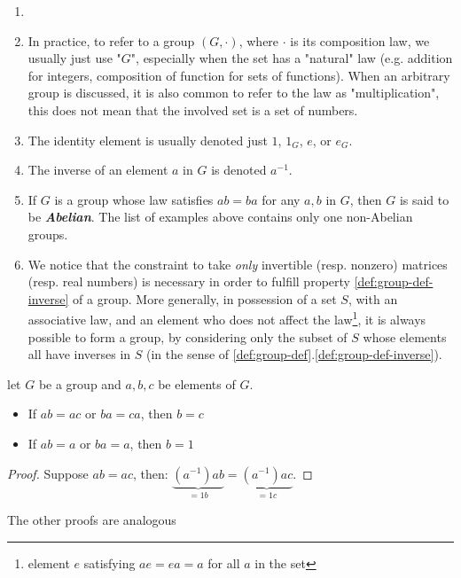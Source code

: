 \begin{remark}

    \begin{enumerate}
        \item[]
        \item In practice, to refer to a group $(G, \cdot)$, where $\cdot$ is its composition law, we usually just use "$G$", especially when the set has a "natural" law (e.g. addition for integers, composition of function for sets of functions). When an arbitrary group is discussed, it is also common to refer to the law as "multiplication", this does not mean that the involved set is a set of numbers.
        \item The identity element is usually denoted just $1$, $1_G$, $e$, or $e_G$.
        \item The inverse of an element $a$ in $G$ is denoted $a^{-1}$. 
        \item If $G$ is a group whose law satisfies $ab = ba$ for any $a, b$ in $G$, then $G$ is said to be \textit{\textbf{Abelian}}. The list of examples above contains only one non-Abelian groups. 
        
        \item We notice that the constraint to take \textit{only} invertible (resp. nonzero) matrices (resp. real numbers) is necessary in order to fulfill property \ref{def:group-def-inverse} of a group.
More generally, in possession of a set $S$, with an associative law, and an element who does not affect the law\footnote{element $e$ satisfying $ae = ea = a$ for all $a$ in the set}, it is always possible to form a group, by considering only the subset of $S$ whose elements all have inverses in $S$ (in the sense of \ref{def:group-def}.\ref{def:group-def-inverse}).
       
    \end{enumerate}
\end{remark} 

\begin{boxedProposition} 
    let $G$ be a group and $a, b, c$ be elements of $G$.\begin{itemize}
     \item If $ab = ac$ or $ba = ca$, then $b=c$
     \item If $ab = a$ or $ba = a$, then $b=1$
    \end{itemize}
\end{boxedProposition}
\begin{proof}
    Suppose $ab = ac$, then: $\underbrace{(a^{-1})ab}_{=1b} = \underbrace{(a^{-1})ac}_{=1c}$.
\end{proof}
The other proofs are analogous

